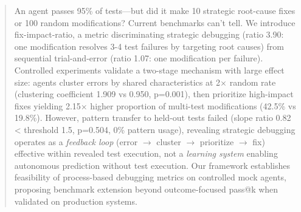\begin{abstract}
An agent passes 95\% of tests—but did it make 10 strategic root-cause fixes or 100 random modifications? Current benchmarks can't tell. We introduce fix-impact-ratio, a metric discriminating strategic debugging (ratio 3.90: one modification resolves 3-4 test failures by targeting root causes) from sequential trial-and-error (ratio 1.07: one modification per failure). Controlled experiments validate a two-stage mechanism with large effect size: agents cluster errors by shared characteristics at 2$\times$ random rate (clustering coefficient 1.909 vs 0.950, p=0.001), then prioritize high-impact fixes yielding 2.15$\times$ higher proportion of multi-test modifications (42.5\% vs 19.8\%). However, pattern transfer to held-out tests failed (slope ratio 0.82 < threshold 1.5, p=0.504, 0\% pattern usage), revealing strategic debugging operates as a \emph{feedback loop} (error $\rightarrow$ cluster $\rightarrow$ prioritize $\rightarrow$ fix) effective within revealed test execution, not a \emph{learning system} enabling autonomous prediction without test execution. Our framework establishes feasibility of process-based debugging metrics on controlled mock agents, proposing benchmark extension beyond outcome-focused pass@k when validated on production systems.
\end{abstract}
